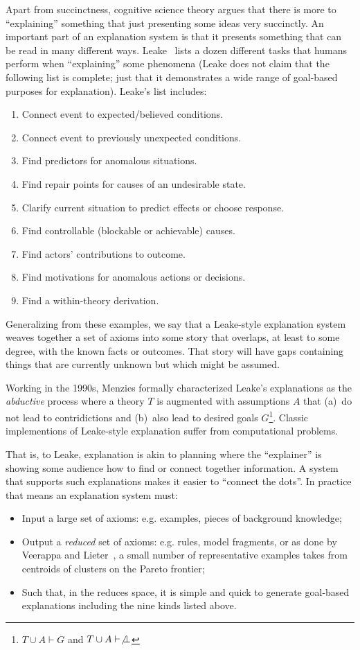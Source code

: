 \documentclass[runningheads]{llncs}
\newcommand{\bi}{\begin{itemize}}
\newcommand{\ei}{\end{itemize}}
\newcommand{\be}{\begin{enumerate}}
\newcommand{\ee}{\end{enumerate}}
\begin{document}
Apart from succinctness, 
cognitive science theory argues that
there is more to ``explaining'' something that just
presenting some ideas very   succinctly. An important part of
an explanation system is that it presents something that
can be read in many different ways.
Leake~\cite{leake91}
lists a dozen different tasks that humans perform when 
``explaining'' some phenomena (Leake does not claim
that the following list is complete; just that
it demonstrates  a wide range of
goal-based purposes for explanation). Leake's list  includes:
\be
\item
Connect event to expected/believed conditions.
\item
Connect event to previously unexpected conditions.
\item
Find predictors for anomalous situations.
\item
Find repair points for causes of an undesirable state.
\item
Clarify current situation to predict effects or choose response.
\item
Find controllable (blockable or achievable) causes.
\item
Find actors’ contributions to outcome.
\item
Find motivations for anomalous actions or decisions.
\item
Find a within-theory derivation.  \ee 
Generalizing
from these examples, we say that a Leake-style
explanation system weaves together a set of axioms
into some story that overlaps, at least to some
degree, with the known facts or outcomes.  That
story will have gaps containing things that are
currently unknown but which might be assumed.

Working in the 1990s, Menzies formally characterized Leake's explanations as
the  {\em abductive} process where a theory $T$
is augmented with assumptions $A$ that (a)~do not lead to contridictions and
(b)~also lead to desired goals $G$\footnote{$T\cup A\vdash G$ and $T\cup A\vdash\not\bot$}.
Classic implementions of Leake-style explanation suffer from computational problems.



That is, to Leake, explanation is akin to planning
where the ``explainer'' is showing some audience how to 
find or connect together information.
A system that supports such explanations makes it easier
to ``connect the dots''. In practice that means an explanation system
must:
\bi
\item Input a large set of axioms: e.g. examples, pieces of background knowledge;
\item Output a {\em reduced} set of axioms:
e.g. rules, model fragments,
or as done by Veerappa and Lieter~\cite{veerappa11}, a small number
of representative examples takes from centroids of clusters on the Pareto
frontier;
\item Such that, in the reduces space, it is simple and quick to generate
goal-based explanations including the nine kinds listed above.
\ei
\end{document}
